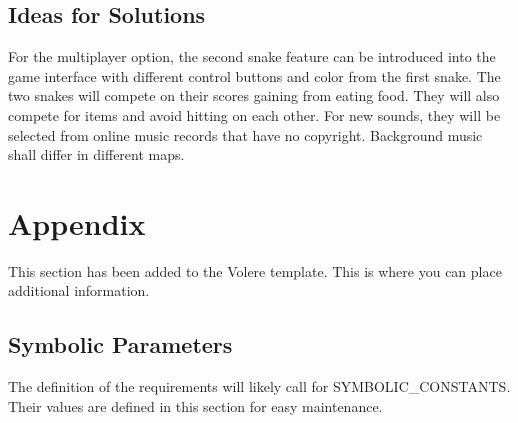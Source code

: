 \documentclass[12pt, titlepage]{article}
\begin{document}
\subsection{Ideas for Solutions}
    For the multiplayer option, the second snake feature can be introduced into the game interface with different control buttons and color from the first snake. The two snakes will compete on their scores gaining from eating food. They will also compete for items and avoid hitting on each other. For new sounds, they will be selected from online music records that have no copyright. Background music shall differ in different maps.




\newpage

\section{Appendix}

This section has been added to the Volere template.  This is where you can place
additional information.

\subsection{Symbolic Parameters}

The definition of the requirements will likely call for SYMBOLIC\_CONSTANTS.
Their values are defined in this section for easy maintenance.
\end{document}
